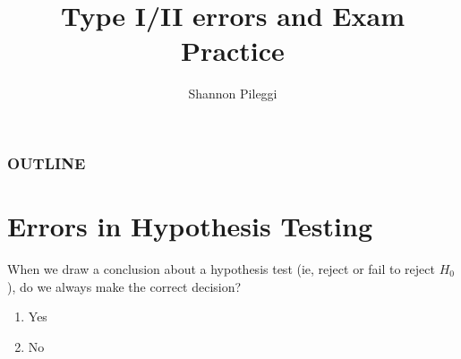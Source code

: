 




\title[Unit 2 Deck 4]{Type I/II errors and Exam Practice}
\author[Pileggi]{Shannon Pileggi}


\date{}




\begin{frame}
\titlepage
\end{frame}

\begin{frame}
\frametitle{OUTLINE\qquad\qquad\qquad} \tableofcontents[hideallsubsections]
\end{frame}


\section[Type I/II Errors]{Errors in Hypothesis Testing}

\begin{frame}
\begin{clicker}
{When we draw a conclusion about a hypothesis test (ie, reject or fail to reject $H_0$), do we always make the correct decision?}
\begin{enumerate}
    \item
    Yes
    \item
    No
\end{enumerate}
\end{clicker}
\end{frame}

